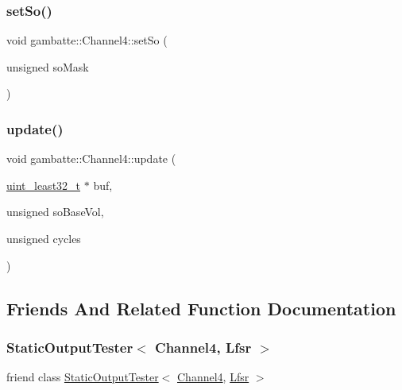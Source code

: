 \subsubsection{\texorpdfstring{set\+So()}{setSo()}}
{\footnotesize\ttfamily void gambatte\+::\+Channel4\+::set\+So (\begin{DoxyParamCaption}\item[{unsigned}]{so\+Mask }\end{DoxyParamCaption})}

\mbox{\label{classgambatte_1_1Channel4_acac1c7d6828c6041f3f113275c470fb5}} 
\subsubsection{\texorpdfstring{update()}{update()}}
{\footnotesize\ttfamily void gambatte\+::\+Channel4\+::update (\begin{DoxyParamCaption}\item[{\hyperlink{namespacegambatte_a0639f09fccfbbd5a8e0796318768e370}{uint\+\_\+least32\+\_\+t} $\ast$}]{buf,  }\item[{unsigned}]{so\+Base\+Vol,  }\item[{unsigned}]{cycles }\end{DoxyParamCaption})}



\subsection{Friends And Related Function Documentation}
\mbox{\label{classgambatte_1_1Channel4_acf79fbb08fa62daf487648e7d1d91458}} 
\subsubsection{\texorpdfstring{Static\+Output\+Tester$<$ Channel4, Lfsr $>$}{StaticOutputTester< Channel4, Lfsr >}}
{\footnotesize\ttfamily friend class \hyperlink{classgambatte_1_1StaticOutputTester}{Static\+Output\+Tester}$<$ \hyperlink{classgambatte_1_1Channel4}{Channel4}, \hyperlink{classgambatte_1_1Channel4_1_1Lfsr}{Lfsr} $>$\hspace{0.3cm}{\ttfamily [friend]}}



